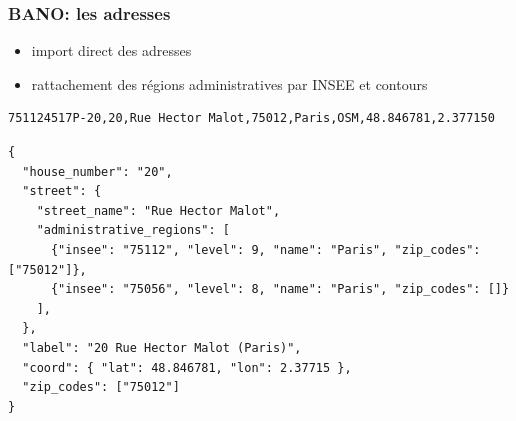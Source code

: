 \documentclass[table]{beamer}
\begin{document}
\begin{frame}[fragile]
  \frametitle{BANO: les adresses}

  \begin{itemize}
  \item import direct des adresses
  \item rattachement des régions administratives par INSEE et contours
  \end{itemize}

\scriptsize
\begin{verbatim}
751124517P-20,20,Rue Hector Malot,75012,Paris,OSM,48.846781,2.377150
\end{verbatim}

\begin{verbatim}
{
  "house_number": "20",
  "street": {
    "street_name": "Rue Hector Malot",
    "administrative_regions": [
      {"insee": "75112", "level": 9, "name": "Paris", "zip_codes": ["75012"]},
      {"insee": "75056", "level": 8, "name": "Paris", "zip_codes": []}
    ],
  },
  "label": "20 Rue Hector Malot (Paris)",
  "coord": { "lat": 48.846781, "lon": 2.37715 },
  "zip_codes": ["75012"]
}
\end{verbatim}
\end{frame}
\end{document}
